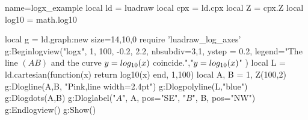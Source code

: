\begin{luadraw}{name=logx_example}
local ld = luadraw
local cpx = ld.cpx
local Z = cpx.Z
local log10 = math.log10

local g = ld.graph:new{ size={14,10,0} }
require 'luadraw_log_axes'
g:Beginlogview("logx", 1, 100, -0.2, 2.2, {
   nbsubdiv={3,1},
   ystep = 0.2,
   legend={"The line $(AB)$ and the curve $y=\\log_{10}(x)$ coincide.","$y=\\log_{10}(x)$"}
})
local L = ld.cartesian(function(x) return log10(x) end, 1,100)
local A, B = 1, Z(100,2)
g:Dlogline(A,B, "Pink,line width=2.4pt")
g:Dlogpolyline(L,"blue") 
g:Dlogdots({A,B})
g:Dloglabel("$A$", A, {pos="SE"}, "$B$", B, {pos="NW"})
g:Endlogview()
g:Show()
\end{luadraw}
